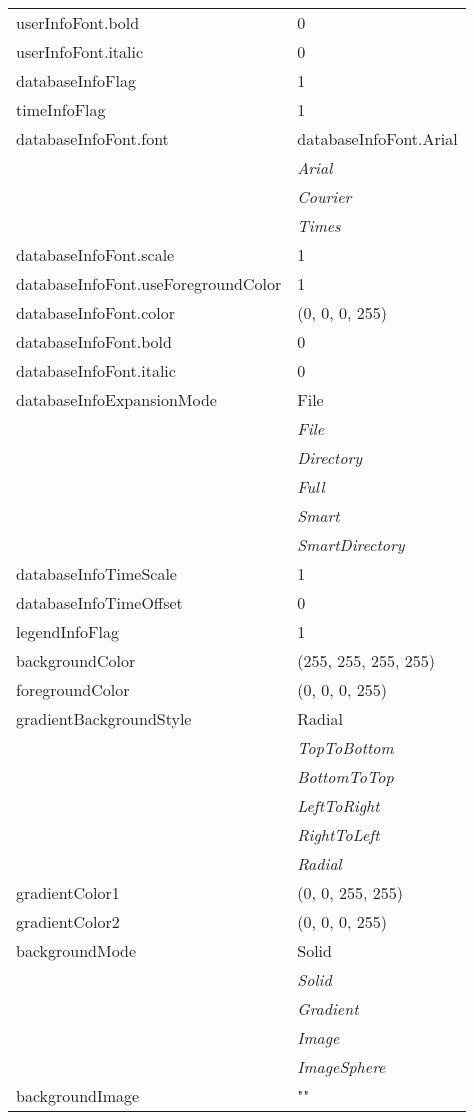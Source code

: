 \documentclass[10pt,a4paper]{report}
\begin{document}
\begin{longtable}{ll}
userInfoFont.bold  &  0 \\
userInfoFont.italic  &  0 \\
databaseInfoFlag  &  1 \\
timeInfoFlag  &  1 \\
databaseInfoFont.font  &  databaseInfoFont.Arial   \\
 & {\it  Arial} \\
 & {\it  Courier} \\
 & {\it  Times} \\
databaseInfoFont.scale  &  1 \\
databaseInfoFont.useForegroundColor  &  1 \\
databaseInfoFont.color  &  (0, 0, 0, 255) \\
databaseInfoFont.bold  &  0 \\
databaseInfoFont.italic  &  0 \\
databaseInfoExpansionMode  &  File   \\
 & {\it  File} \\
 & {\it  Directory} \\
 & {\it  Full} \\
 & {\it  Smart} \\
 & {\it  SmartDirectory} \\
databaseInfoTimeScale  &  1 \\
databaseInfoTimeOffset  &  0 \\
legendInfoFlag  &  1 \\
backgroundColor  &  (255, 255, 255, 255) \\
foregroundColor  &  (0, 0, 0, 255) \\
gradientBackgroundStyle  &  Radial   \\
 & {\it  TopToBottom} \\
 & {\it  BottomToTop} \\
 & {\it  LeftToRight} \\
 & {\it  RightToLeft} \\
 & {\it  Radial} \\
gradientColor1  &  (0, 0, 255, 255) \\
gradientColor2  &  (0, 0, 0, 255) \\
backgroundMode  &  Solid   \\
 & {\it  Solid} \\
 & {\it  Gradient} \\
 & {\it  Image} \\
 & {\it  ImageSphere} \\
backgroundImage  &  "" \\

\end{longtable}
\end{document}
